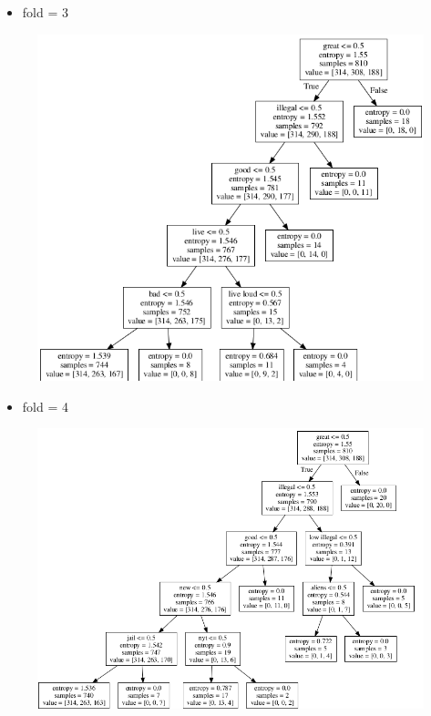 \documentclass[11pt]{article}
\makeatletter
\def\maxwidth{\ifdim\Gin@nat@width>\linewidth\linewidth
    \else\Gin@nat@width\fi}
\let\Oldincludegraphics\includegraphics
\renewcommand{\includegraphics}[1]{\Oldincludegraphics[width=.8\maxwidth]{#1}}
\providecommand{\tightlist}{%
      \setlength{\itemsep}{0pt}\setlength{\parskip}{0pt}}
\makeatother
\begin{document}
\begin{itemize}
\tightlist
\item
  fold = 3
\end{itemize}

\begin{figure}[H]
\centering
\includegraphics{imgs/3.png}
\caption{}
\end{figure}

\begin{itemize}
\tightlist
\item
  fold = 4
\end{itemize}

\begin{figure}[H]
\centering
\includegraphics{imgs/4.png}
\caption{}
\end{figure}
\end{document}
